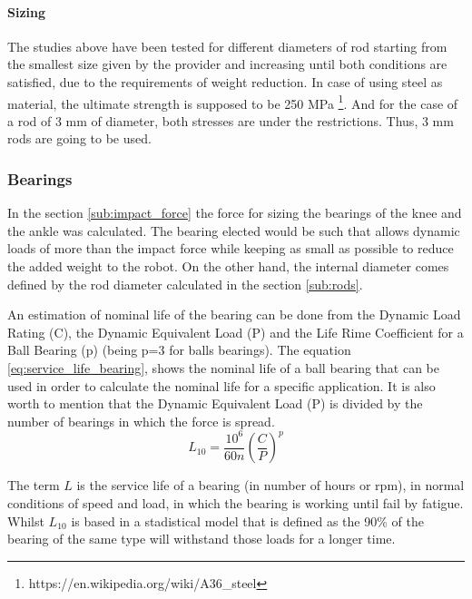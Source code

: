  \paragraph{Sizing} %
  \label{ssub:sizing}
  The studies above have been tested for different diameters of rod starting from the smallest size given by the provider and increasing until both conditions are satisfied, due to the requirements of weight reduction.
  In case of using steel as material, the ultimate strength is supposed to be 250 MPa \footnote{https://en.wikipedia.org/wiki/A36\_steel}.
  And for the case of a rod of 3 mm of diameter, both stresses are under the restrictions.
  Thus, 3 mm rods are going to be used.

\subsubsection{Bearings} %
\label{ssub:bearings}
In the section \ref{sub:impact_force} the force for sizing the bearings of the knee and the ankle was calculated.
The bearing elected would be such that allows dynamic loads of more than the impact force while keeping as small as possible to reduce the added weight to the robot.
On the other hand, the internal diameter comes defined by the rod diameter calculated in the section \ref{sub:rods}.

An estimation of nominal life of the bearing can be done from the Dynamic Load Rating (C), the Dynamic Equivalent Load (P) and the Life Rime Coefficient for a Ball Bearing (p) (being p=3 for balls bearings).
The equation \ref{eq:service_life_bearing}, shows the nominal life of a ball bearing that can be used in order to calculate the nominal life for a specific application.
It is also worth to mention that the Dynamic Equivalent Load (P) is divided by the number of bearings in which the force is spread.
\begin{equation}
  \label{eq:service_life_bearing}
  L_{10} = \frac{10^{6}}{60 n} \left(\frac{C}{P}\right)^{p}
\end{equation}

The term $L$ is the service life of a bearing (in number of hours or rpm), in normal conditions of speed and load, in which the bearing is working until fail by fatigue. 
Whilst $L_{10}$ is based in a stadistical model that is defined as the 90\% of the bearing of the same type will withstand those loads for a longer time.


